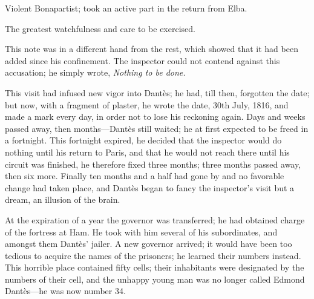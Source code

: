 Violent Bonapartist; took an active part in the return from Elba.

The greatest watchfulness and care to be exercised.

This note was in a different hand from the rest, which showed that it
had been added since his confinement. The inspector could not contend
against this accusation; he simply wrote, \textit{Nothing to be done.}

This visit had infused new vigor into Dantès; he had, till then,
forgotten the date; but now, with a fragment of plaster, he wrote the
date, 30th July, 1816, and made a mark every day, in order not to lose
his reckoning again. Days and weeks passed away, then months—Dantès
still waited; he at first expected to be freed in a fortnight. This
fortnight expired, he decided that the inspector would do nothing until
his return to Paris, and that he would not reach there until his
circuit was finished, he therefore fixed three months; three months
passed away, then six more. Finally ten months and a half had gone by
and no favorable change had taken place, and Dantès began to fancy the
inspector’s visit but a dream, an illusion of the brain.

At the expiration of a year the governor was transferred; he had
obtained charge of the fortress at Ham. He took with him several of his
subordinates, and amongst them Dantès’ jailer. A new governor arrived;
it would have been too tedious to acquire the names of the prisoners;
he learned their numbers instead. This horrible place contained fifty
cells; their inhabitants were designated by the numbers of their cell,
and the unhappy young man was no longer called Edmond Dantès—he was now
number 34.

